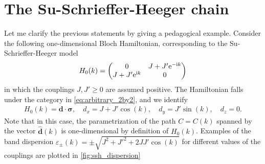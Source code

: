 \section{The Su-Schrieffer-Heeger chain}
\label{sec:the_SSH_chain}
%
%
Let me clarify the previous statements by giving a pedagogical example.
Consider the following one-dimensional Bloch Hamiltonian, corresponding to the Su-Schrieffer-Heeger model~\cite{Heeger1988}
\begin{align}
    H_0(k)
    =
    \begin{pmatrix}
        0 & J+J'\mathrm e^{-\mathrm i k}\\
        J+J'\mathrm e^{\mathrm i k} & 0
    \end{pmatrix}
\end{align}
in which the couplings $J,J'\geq0$ are assumed positive.
The Hamiltonian falls under the category in \ref{eq:arbitrary_2by2}, and we identify
\begin{align}
    H_0(k) = {\bm d}\cdot{\bm\sigma},
    \quad
    d_x = J+J'\cos(k),
    \quad
    d_y = J'\sin(k),
    \quad
    d_z = 0.
\end{align}
Note that in this case, the parametrization of the path $C=C(k)$ spanned by the vector $\hat{\bm d}(k)$ is one-dimensional by definition of $H_0(k)$.
Examples of the band dispersion $\varepsilon_\pm(k)=\pm\sqrt{J^2+J'^2+2JJ'\cos(k)}$ for different values of the couplings are plotted in \cref{fig:ssh_dispersion}
